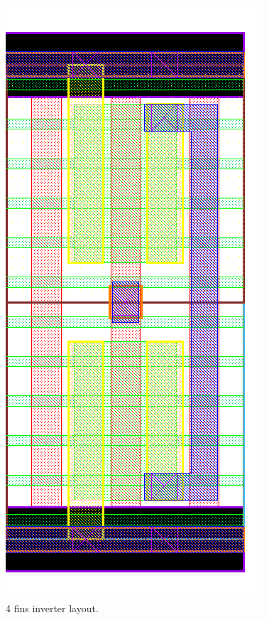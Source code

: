 \documentclass[pgmicro,mestrado,english]{iiufrgs}
\begin{document}
\begin{figure}[H]
\centering
\includegraphics[width=\textwidth,height=\textheight,keepaspectratio]{INV4F.png}
\caption{4 fins inverter layout.}
\label{fig:INV4F}
\end{figure}
\end{document}

